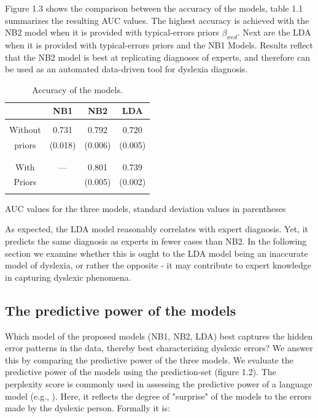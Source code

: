 {{ \vspace*{2\baselineskip}

Figure 1.3 shows the comparison between the accuracy of the models, table 1.1 summarizes the resulting AUC values. The highest accuracy is achieved with the NB2 model when it is provided with typical-errors priors $\beta_{wed}$. Next are the LDA when it is provided with typical-errors priors and the NB1 Models. Results reflect that the NB2 model is best at replicating diagnoses of experts, and therefore can be used as an automated data-driven tool for dyslexia diagnosis.

\begin{table}
\centering
\caption{Accuracy of the models.} 

\begin{tabular}{|c|c|c|c|} \hline
& NB1 & NB2 & LDA \\
\hline
&&&\\
Without & 0.731 & 0.792 & 0.720 \\
priors & (0.018) & (0.006) & (0.005) \\
&&&\\
\hline
&&&\\
With & --- & 0.801 & 0.739 \\
Priors &  & (0.005) & (0.002) \\
&&&\\
\hline\end{tabular}
\bigskip

AUC values for the three models, standard deviation values in parentheses
\end{table}

As expected, the LDA model reasonably correlates with expert diagnosis. Yet, it predicts the same diagnosis as experts in fewer cases than NB2. In the following section we examine whether this is ought to the LDA model being an inaccurate model of dyslexia, or rather the opposite - it may contribute to expert knowledge in capturing dyslexic phenomena.

\subsection{The predictive power of the models}
Which model of the proposed models (NB1, NB2, LDA) best captures the hidden error patterns in the data, thereby best characterizing dyslexic errors? We answer this by comparing the predictive power of the three models. We evaluate the predictive power of the models using the prediction-set (figure 1.2).
The perplexity score is commonly used in assessing the predictive power of a language model (e.g., \citealp{bnj03}). Here, it reflects the degree of "surprise" of the models to the errors made by the dyslexic person. Formally it is: 

}}
